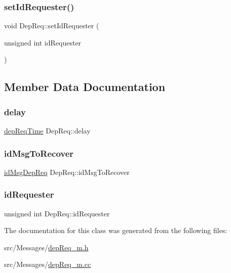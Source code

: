 \subsubsection{\texorpdfstring{set\+Id\+Requester()}{setIdRequester()}}
{\footnotesize\ttfamily void Dep\+Req\+::set\+Id\+Requester (\begin{DoxyParamCaption}\item[{unsigned int}]{id\+Requester }\end{DoxyParamCaption})\hspace{0.3cm}{\ttfamily [virtual]}}



\subsection{Member Data Documentation}
\mbox{\label{classDepReq_a5df5ddeac692e25c089b458faf51e0c9}} 
\subsubsection{\texorpdfstring{delay}{delay}}
{\footnotesize\ttfamily \hyperlink{depReq__m_8h_ae16a4057335e3a89fda3f6019868733b}{dep\+Req\+Time} Dep\+Req\+::delay\hspace{0.3cm}{\ttfamily [protected]}}

\mbox{\label{classDepReq_a8547e169d4670212c0b612924dda94cc}} 
\subsubsection{\texorpdfstring{id\+Msg\+To\+Recover}{idMsgToRecover}}
{\footnotesize\ttfamily \hyperlink{depReq__m_8h_a2bbb71ed0e9660ec02d81471eafd9c29}{id\+Msg\+Dep\+Req} Dep\+Req\+::id\+Msg\+To\+Recover\hspace{0.3cm}{\ttfamily [protected]}}

\mbox{\label{classDepReq_a26936e95ef3fae4753d2442318646c6b}} 
\subsubsection{\texorpdfstring{id\+Requester}{idRequester}}
{\footnotesize\ttfamily unsigned int Dep\+Req\+::id\+Requester\hspace{0.3cm}{\ttfamily [protected]}}



The documentation for this class was generated from the following files\+:\begin{DoxyCompactItemize}
\item 
src/\+Messages/\hyperlink{depReq__m_8h}{dep\+Req\+\_\+m.\+h}\item 
src/\+Messages/\hyperlink{depReq__m_8cc}{dep\+Req\+\_\+m.\+cc}\end{DoxyCompactItemize}
